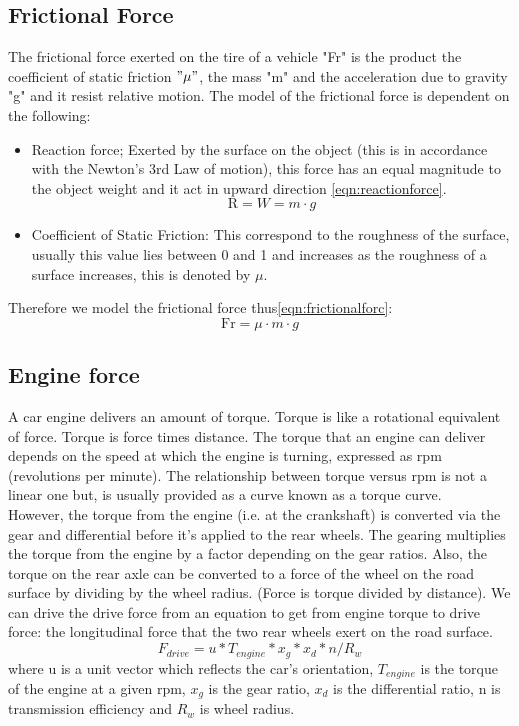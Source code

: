 \documentclass{book}
\begin{document}
\subsection{Frictional Force}
The frictional force exerted on the tire of a vehicle "Fr" is the product the coefficient of static friction $"\mu"$,  the mass "m" and the acceleration due to gravity "g" and it resist relative motion. The model of the frictional force is dependent on the following:
\begin{itemize}
    \item Reaction force; Exerted by the surface on the object (this is in accordance with the Newton's 3rd Law of motion), this force has an equal magnitude to the object weight and it act in upward direction \ref{eqn:reactionforce}.
    \begin{equation}
     \mbox{R} = W = m \cdot g
     \label{eqn:reactionforce}
    \end{equation}

\item Coefficient of Static Friction: This correspond to the roughness of the surface, usually this value lies between 0 and 1 and increases as the roughness of a surface increases, this is denoted by $\mu$.\\
\end{itemize}
Therefore we model the frictional force thus\ref{eqn:frictionalforc}:
\begin{equation}
 \mbox{Fr} = \mu \cdot m \cdot g %
 \label{eqn:frictionalforc}
\end{equation}


\subsection{Engine force}
A car engine delivers an amount of torque.  Torque is like a rotational equivalent of force. Torque is force times distance. The torque that an engine can deliver depends on the speed at which the engine is turning, expressed as rpm (revolutions per minute). The relationship between torque versus rpm is not a linear one but, is usually provided as a curve known as a torque curve.\\
However, the torque from the engine (i.e. at the crankshaft) is converted via the gear and differential before it's applied to the rear wheels. The gearing multiplies the torque from the engine by a factor depending on the gear ratios. Also, the torque on the rear axle can be converted to a force of the wheel on the road surface by dividing by the wheel radius. (Force is torque divided by distance).
We can drive the drive force from an equation to get from engine torque to drive force: the longitudinal force that the two rear wheels exert on the road surface.
\begin{equation}
  F_{drive} = u * T_{engine} * x_{g} * x_{d} * n / R_{w}
\end{equation}
  where
    u is a unit vector which reflects the car's orientation,
   $ T_{engine}$ is the torque of the engine at a given rpm,
   $ x_{g} $ is the gear ratio,
    $x_{d}$ is the differential ratio,
    n is transmission efficiency and
    $R_{w}$ is wheel radius.
\end{document}
